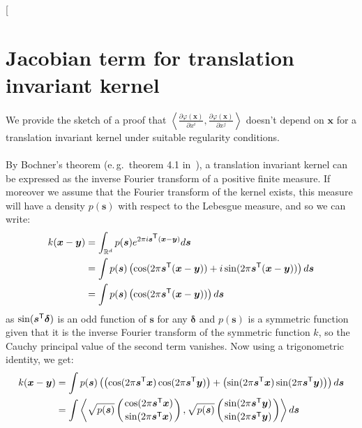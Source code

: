 \documentclass[twoside]{article}
\newcommand{\transpose}[1]{#1^{\mbox{\sf \scriptsize T}}}
\newcommand{\eg}{e.\,g.\ }
\begin{document}
\twocolumn[
\section{Jacobian term for translation invariant kernel\label{sec:Jacobian_shift}}

We provide the sketch of a proof that $\left\langle\frac{\partial\varphi(\bm{x})}{\partial x^i} ,  \frac{\partial\varphi(\bm{x})}{\partial x^j}\right\rangle$ doesn't depend on $\bm{x}$ for a translation invariant kernel under suitable regularity conditions.

\paragraph{}By Bochner's theorem (\eg theorem 4.1 in~\cite{Rasmussen2006}), a translation invariant kernel can be expressed as the inverse Fourier transform of a positive finite measure. If moreover we assume that the Fourier transform of the kernel exists, this measure will have a density $p(\bm{s})$ with respect to the Lebesgue measure, and so we can write:
\begin{align*}
 k(\bm{x}-\bm{y}) & =  \int_{\mathbb{R}^d} p(\bm{s}) e^{2\pi i \transpose{\bm{s}} (\bm{x}-\bm{y})} d\bm{s} \\
 &= \int p(\bm{s}) \left( \cos(2\pi \transpose{\bm{s}} (\bm{x}-\bm{y}))+i
 \sin(2\pi \transpose{\bm{s}} (\bm{x}-\bm{y})) \right) d\bm{s} \\
 &= \int p(\bm{s}) \left( \cos(2\pi \transpose{\bm{s}} (\bm{x}-\bm{y})) \right) d\bm{s}
\end{align*}
as $\sin(\transpose{\bm{s}}\bm{\delta})$ is an odd function of $\bm{s}$ for any $\bm{\delta}$ and $p(\bm{s})$ is a symmetric function given that it is the inverse Fourier transform of the symmetric function $k$, so the Cauchy principal value of the second term vanishes. Now using a trigonometric identity, we get:
\begin{align*}
 k(\bm{x}-\bm{y}) & = \int p(\bm{s}) \left( \left( \cos(2\pi \transpose{\bm{s}}\bm{x})  \cos(2\pi \transpose{\bm{s}}\bm{y}) \right) +
 \left( \sin(2\pi \transpose{\bm{s}}\bm{x})  \sin(2\pi \transpose{\bm{s}}\bm{y}) \right) \right) d\bm{s} \\
  &= \int \left\langle \sqrt{p(\bm{s})} \left( {\cos(2\pi \transpose{\bm{s}}\bm{x}) \atop \sin(2\pi \transpose{\bm{s}}\bm{x})} \right) , \sqrt{p(\bm{s})} \left( {\sin(2\pi \transpose{\bm{s}}\bm{y}) \atop \sin(2\pi \transpose{\bm{s}}\bm{y})} \right) \right\rangle d\bm{s}
\end{align*}
\end{document}
